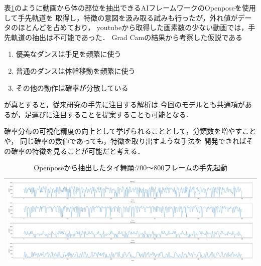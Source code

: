 表\ref{json}のように動画から体の部位を抽出できるAIフレームワークのOpenposeを使用して手先軌道を
取得し，特徴の意図を汲み取る試みも行ったが，外れ値がデータのほとんどを占めており，
youtubeから取得した画素数の少ない動画では，手先軌道の抽出は不可能であった．
Grad Camの結果から考察した仮説である
\begin{enumerate}
  \item 優美なダンスは手足を頻繁に使う
  \item 普通のダンスは体幹移動を頻繁に使う
  \item その他の動作は確率が分散している
\end{enumerate}
が真とすると，従来研究の手先に注目する解析は
今回のモデルとも共通項があるが，足運びに注目することを提案することも可能となる．

確率分布の可視化精度の向上として挙げられることとして，分類数を増やすことや，
同じ確率の数値であっても，特徴を取り出すような手法を
開発できればその確率の特徴を見ることが可能だと考える．

\begin{table}[b]
  \begin{center}
    \begin{tabular}{|c|} \hline
      \includegraphics[width=130mm]{images/dist/thai_elegant_json.pdf} \\ \hline
    \end{tabular}
  \end{center}
  \caption{Openposeから抽出したタイ舞踊:700〜800フレームの手先起動}
  \label{json}
\end{table}
\clearpage